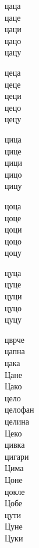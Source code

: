 \documentclass[a5paper,12pt]{article}
\newenvironment{activity}[1]{%
  \begin{tcolorbox}[colback=boxcolor,colframe=titlecolor,title={\textbf{#1}},fonttitle=\bfseries]
}{%
  \end{tcolorbox}
}
\begin{document}
\vspace{1cm}
\begin{minipage}[t]{0.18\textwidth}
  цаца\\
  цаце\\
  цаци\\
  цацо\\
  цацу
\end{minipage}
\hfill
\begin{minipage}[t]{0.18\textwidth}
  цеца\\
  цеце\\
  цеци\\
  цецо\\
  цецу
\end{minipage}
\hfill
\begin{minipage}[t]{0.18\textwidth}
  цица\\
  цице\\
  цици\\
  цицо\\
  цицу
\end{minipage}
\hfill 
\begin{minipage}[t]{0.18\textwidth}
  цоца\\
  цоце\\
  цоци\\
  цоцо\\
  цоцу
\end{minipage}
\hfill 
\begin{minipage}[t]{0.18\textwidth}
  цуца\\
  цуце\\
  цуци\\
  цуцо\\
  цуцу
\end{minipage}

\begin{activity}{Зборчиња}
\begin{multicols}{4}
цврче\\ цапна\\ цака\\ Цане\\ Цако\\ цело\\ целофан\\ целина\\ Цеко\\ цивка\\ цигари\\ Цима\\ Цоне\\ цокле\\ Цобе\\ цути\\ Цуне\\ Цуки
\end{multicols}
\end{activity}
\end{document}
